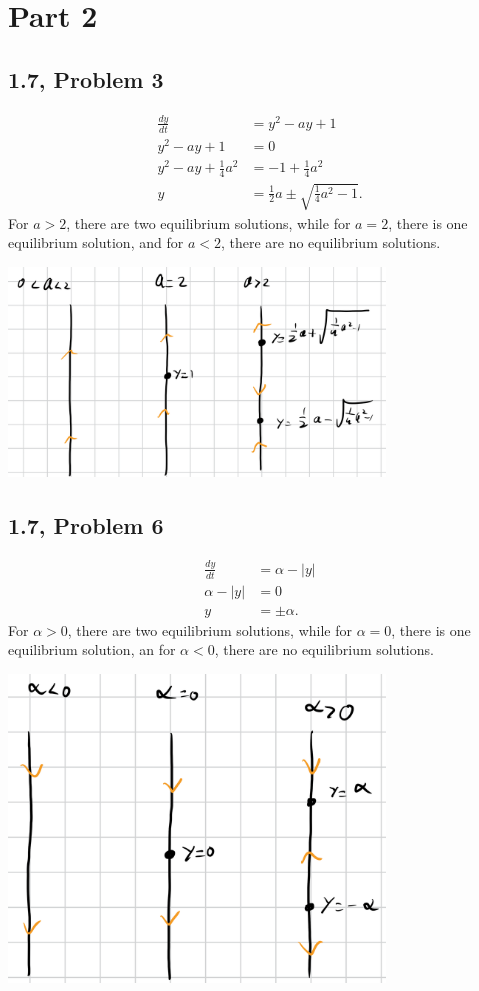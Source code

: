 \documentclass[10pt]{mypackage}
\begin{document}
\section{Part 2}%
\subsection{1.7, Problem 3}%
\begin{align*}
  \frac{dy}{dt} &= y^2 - ay + 1\\
  y^2 - ay + 1 &= 0\\
  y^2 - ay + \frac{1}{4}a^2 &= -1 + \frac{1}{4}a^2\\
  y&= \frac{1}{2}a \pm \sqrt{\frac{1}{4}a^2 - 1}.
\end{align*}
For $a > 2$, there are two equilibrium solutions, while for $a = 2$, there is one equilibrium solution, and for $a < 2$, there are no equilibrium solutions.
\begin{center}
  \includegraphics[width=10cm]{images/1_7_3.png}
\end{center}
\subsection{1.7, Problem 6}%
\begin{align*}
  \frac{dy}{dt} &= \alpha - |y|\\
  \alpha - |y| &= 0\\
  y &= \pm \alpha.
\end{align*}
For $\alpha > 0$, there are two equilibrium solutions, while for $\alpha = 0$, there is one equilibrium solution, an for $\alpha < 0$, there are no equilibrium solutions.
\begin{center}
  \includegraphics[width=10cm]{images/1_7_6.png}
\end{center}
\end{document}
